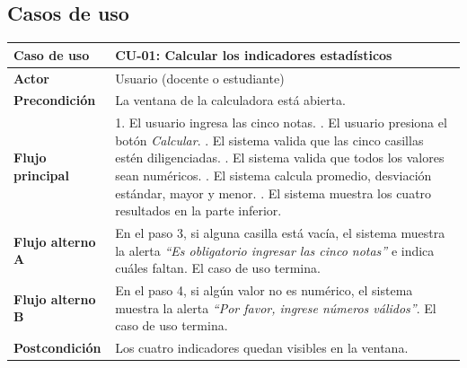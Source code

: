 \documentclass[11pt, a4paper]{article}
\begin{document}
\subsection{Casos de uso}
\begin{table}[H]
\centering
\begin{tabularx}{\textwidth}{@{}l X@{}}
\toprule
\textbf{Caso de uso} & CU-01: Calcular los indicadores estadísticos \\
\midrule
\textbf{Actor} & Usuario (docente o estudiante) \\
\textbf{Precondición} & La ventana de la calculadora está abierta. \\
\textbf{Flujo principal} & 1. El usuario ingresa las cinco notas. \newline
                           2. El usuario presiona el botón \textit{Calcular}. \newline
                           3. El sistema valida que las cinco casillas estén diligenciadas. \newline
                           4. El sistema valida que todos los valores sean numéricos. \newline
                           5. El sistema calcula promedio, desviación estándar, mayor y menor. \newline
                           6. El sistema muestra los cuatro resultados en la parte inferior. \\
\textbf{Flujo alterno A} & En el paso 3, si alguna casilla está vacía, el sistema muestra la
                           alerta \textit{``Es obligatorio ingresar las cinco notas''} e indica
                           cuáles faltan. El caso de uso termina. \\
\textbf{Flujo alterno B} & En el paso 4, si algún valor no es numérico, el sistema muestra la
                           alerta \textit{``Por favor, ingrese números válidos''}. El caso de uso termina. \\
\textbf{Postcondición} & Los cuatro indicadores quedan visibles en la ventana. \\
\bottomrule
\end{tabularx}
\end{table}
\end{document}
